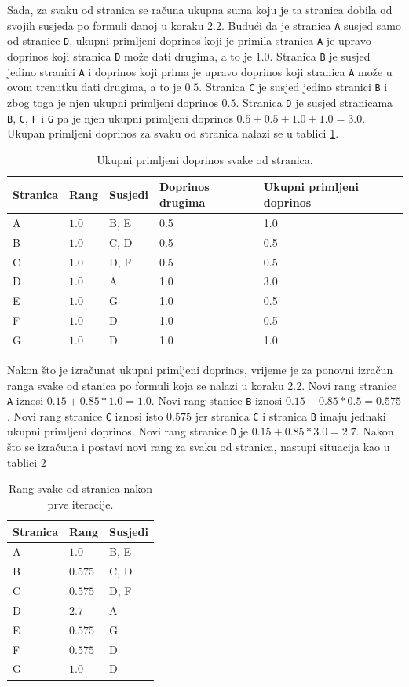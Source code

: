 \documentclass[times, utf8, zavrsni, numeric]{fer}
\begin{document}
Sada, za svaku od stranica se računa ukupna suma koju je ta stranica dobila od svojih susjeda po formuli danoj u koraku 2.2.
Budući da je stranica \texttt{A} susjed samo od stranice \texttt{D}, ukupni primljeni doprinos koji je primila stranica \texttt{A} je upravo doprinos koji stranica \texttt{D} može dati drugima, a to je $1.0$. Stranica \texttt{B} je susjed jedino stranici \texttt{A} i doprinos koji prima je upravo doprinos koji stranica \texttt{A} može u ovom trenutku dati drugima, a to je $0.5$. Stranica \texttt{C} je susjed jedino stranici \texttt{B} i zbog toga je njen ukupni primljeni doprinos $0.5$. Stranica \texttt{D} je susjed stranicama \texttt{B}, \texttt{C}, \texttt{F} i \texttt{G} pa je njen ukupni primljeni doprinos $0.5 + 0.5 + 1.0 + 1.0 = 3.0$. Ukupan primljeni doprinos za svaku od stranica nalazi se u tablici \ref{tbl:pageRankKorak22ap1}.
\pagebreak
\begin{table}[htb]
\caption{Ukupni primljeni doprinos svake od stranica.}
\label{tbl:pageRankKorak22ap1}
\centering
\begin{tabular}{lllll} 
\hline
Stranica & Rang & Susjedi & Doprinos drugima & Ukupni primljeni doprinos\\
\hline
A & $1.0$ & B, E & 0.5 & 1.0\\
B & $1.0$ & C, D & 0.5 & 0.5\\
C & $1.0$ & D, F & 0.5 & 0.5\\
D & $1.0$ & A & 1.0 & 3.0\\
E & $1.0$ & G & 1.0 & 0.5\\
F & $1.0$ & D & 1.0 & 0.5\\
G & $1.0$ & D & 1.0 & 1.0\\
\hline
\end{tabular}
\end{table}

Nakon što je izračunat ukupni primljeni doprinos, vrijeme je za ponovni izračun ranga svake od stanica po formuli koja se nalazi u koraku 2.2. Novi rang stranice \texttt{A} iznosi $0.15 + 0.85 * 1.0 = 1.0$. Novi rang stanice \texttt{B} iznosi $0.15 + 0.85 * 0.5 = 0.575$. Novi rang stranice \texttt{C} iznosi isto $0.575$ jer stranica \texttt{C} i stranica \texttt{B} imaju jednaki ukupni primljeni doprinos. Novi rang stranice \texttt{D} je $0.15 + 0.85 * 3.0 = 2.7$. Nakon što se izračuna i postavi novi rang za svaku od stranica, nastupi situacija kao u tablici \ref{tbl:pageRankStanje1}

\begin{table}[htb]
\caption{Rang svake od stranica nakon prve iteracije.}
\label{tbl:pageRankStanje1}
\centering
\begin{tabular}{lll} 
\hline
Stranica & Rang & Susjedi \\
\hline
A & $1.0$ & B, E\\
B & $0.575$ & C, D\\
C & $0.575$ & D, F\\
D & $2.7$ & A\\
E & $0.575$ & G\\
F & $0.575$ & D\\
G & $1.0$ & D\\
\hline
\end{tabular}
\end{table}
\end{document}
